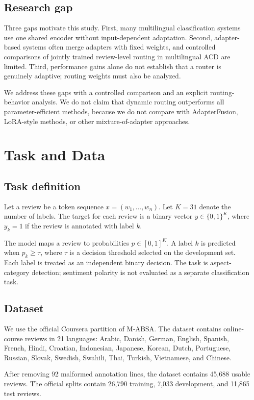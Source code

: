 \documentclass[review,12pt]{elsarticle}
\begin{document}
\subsection{Research gap}
Three gaps motivate this study. First, many multilingual classification systems use one shared encoder without input-dependent adaptation. Second, adapter-based systems often merge adapters with fixed weights, and controlled comparisons of jointly trained review-level routing in multilingual ACD are limited. Third, performance gains alone do not establish that a router is genuinely adaptive; routing weights must also be analyzed.

We address these gaps with a controlled comparison and an explicit routing-behavior analysis. We do not claim that dynamic routing outperforms all parameter-efficient methods, because we do not compare with AdapterFusion, LoRA-style methods, or other mixture-of-adapter approaches.

\section{Task and Data}

\subsection{Task definition}
Let a review be a token sequence $x=(w_1,\ldots,w_n)$. Let $K=31$ denote the number of labels. The target for each review is a binary vector $y\in\{0,1\}^K$, where $y_k=1$ if the review is annotated with label $k$.

The model maps a review to probabilities $p\in[0,1]^K$. A label $k$ is predicted when $p_k\geq\tau$, where $\tau$ is a decision threshold selected on the development set. Each label is treated as an independent binary decision. The task is aspect-category detection; sentiment polarity is not evaluated as a separate classification task.

\subsection{Dataset}
We use the official Coursera partition of M-ABSA. The dataset contains online-course reviews in 21 languages: Arabic, Danish, German, English, Spanish, French, Hindi, Croatian, Indonesian, Japanese, Korean, Dutch, Portuguese, Russian, Slovak, Swedish, Swahili, Thai, Turkish, Vietnamese, and Chinese.

After removing 92 malformed annotation lines, the dataset contains 45,688 usable reviews. The official splits contain 26,790 training, 7,033 development, and 11,865 test reviews.
\end{document}
